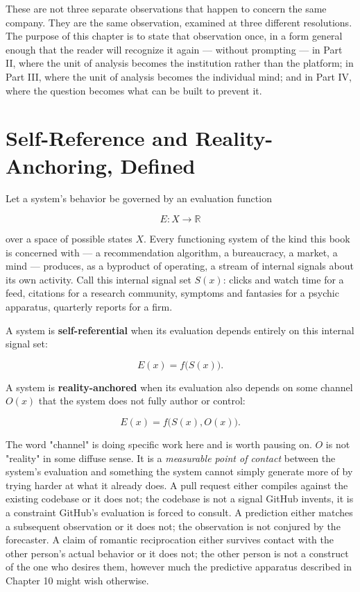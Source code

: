 \documentclass[12pt,a4paper]{book}
\begin{document}
These are not three separate observations that happen to concern the same company. They are the same observation, examined at three different resolutions. The purpose of this chapter is to state that observation once, in a form general enough that the reader will recognize it again — without prompting — in Part II, where the unit of analysis becomes the institution rather than the platform; in Part III, where the unit of analysis becomes the individual mind; and in Part IV, where the question becomes what can be built to prevent it.

\section{Self-Reference and Reality-Anchoring, Defined}

Let a system's behavior be governed by an evaluation function

\[E: X \to \mathbb{R}\]

over a space of possible states $X$. Every functioning system of the kind this book is concerned with — a recommendation algorithm, a bureaucracy, a market, a mind — produces, as a byproduct of operating, a stream of internal signals about its own activity. Call this internal signal set $S(x)$: clicks and watch time for a feed, citations for a research community, symptoms and fantasies for a psychic apparatus, quarterly reports for a firm.

A system is \textbf{self-referential} when its evaluation depends entirely on this internal signal set:

\[E(x) = f\bigl(S(x)\bigr).\]

A system is \textbf{reality-anchored} when its evaluation also depends on some channel $O(x)$ that the system does not fully author or control:

\[E(x) = f\bigl(S(x), O(x)\bigr).\]

The word "channel" is doing specific work here and is worth pausing on. $O$ is not "reality" in some diffuse sense. It is a \emph{measurable point of contact} between the system's evaluation and something the system cannot simply generate more of by trying harder at what it already does. A pull request either compiles against the existing codebase or it does not; the codebase is not a signal GitHub invents, it is a constraint GitHub's evaluation is forced to consult. A prediction either matches a subsequent observation or it does not; the observation is not conjured by the forecaster. A claim of romantic reciprocation either survives contact with the other person's actual behavior or it does not; the other person is not a construct of the one who desires them, however much the predictive apparatus described in Chapter 10 might wish otherwise.
\end{document}
